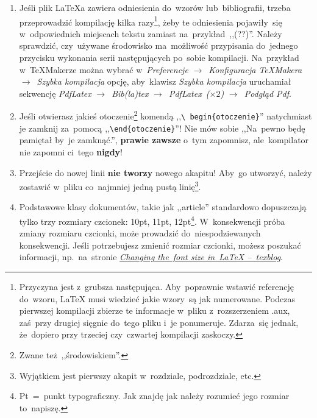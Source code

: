 \documentclass[a4paper,11pt]{article}
\newcommand{\tbs}{\textbackslash}  %
\newcommand{\tb}{\textbf}
\begin{document}
\begin{enumerate}
\item Jeśli plik \LaTeX a zawiera odniesienia do~wzorów
  lub~bibliografii, trzeba przeprowadzić kompilację kilka
  razy\footnote{Przyczyna jest z~grubsza następująca. Aby~poprawnie
    wstawić referencję do~wzoru, \LaTeX{} musi wiedzieć jakie wzory~są
    jak numerowane. Podczas pierwszej kompilacji zbierze te informacje
    w~pliku z~rozszerzeniem .aux, zaś~przy drugiej sięgnie do~tego
    pliku i~je ponumeruje. Zdarza~się jednak, że~dopiero przy trzeciej
    czy~czwartej kompilacji zaskoczy.}, żeby te odniesienia
  pojawiły~się w~odpowiednich miejscach tekstu zamiast
  na~przykład~,,(??)''. Należy sprawdzić, czy~używane środowisko
  ma~możliwość przypisania do~jednego przycisku wykonania serii
  następujących po~sobie kompilacji. Na~przykład w~\TeX Makerze można
  wybrać w~\emph{Preferencje} $\to$~\emph{Konfiguracja \TeX Makera}
  $\to$~\emph{Szybka kompilacja} opcję, aby~klawisz \emph{Szybka
    kompilacja} uruchamiał sekwencję \emph{PdfLatex}
  $\to$~\emph{Bib(la)tex} $\to$~\emph{PdfLatex~($\times 2$)}
  $\to$~\emph{Podgląd Pdf}.

\item Jeśli otwierasz jakieś otoczenie\footnote{Zwane
    też~,,środowiskiem''.} komendą ,,\texttt{\tbs
    begin\{otoczenie\}}'' natychmiast je zamknij za~pomocą
  ,,\texttt{\tbs end\{otoczenie\}}''! Nie mów sobie ,,Na~pewno będę
  pamiętał by~je zamknąć.'', \tb{prawie zawsze} o~tym zapomnisz,
  ale~kompilator nie zapomni ci~tego \tb{nigdy}!

\item Przejście do nowej linii \tb{nie tworzy} nowego akapitu! Aby~go
  utworzyć, należy zostawić w~pliku co~najmniej jedną pustą
  linię\footnote{Wyjątkiem jest pierwszy akapit w~rozdziale,
    podrozdziale, etc.}.

\item Podstawowe klasy dokumentów, takie jak ,,article'' standardowo
  dopuszczają tylko trzy rozmiary czcionek: 10pt, 11pt,
  12pt\footnote{Pt~=~punkt typograficzny. Jak znajdę jak należy
    rozumieć jego rozmiar to~napiszę.}. W~konsekwencji próba zmiany
  rozmiaru czcionki, może prowadzić do~niespodziewanych konsekwencji.
  Jeśli potrzebujesz zmienić rozmiar czcionki, możesz poszukać
  informacji, np.~na~stronie
  \href{https://texblog.org/2012/08/29/changing-the-font-size-in-latex/}{\emph{Changing
      the~font size in~LaTeX --~texblog}}.


\end{enumerate}
\end{document}
